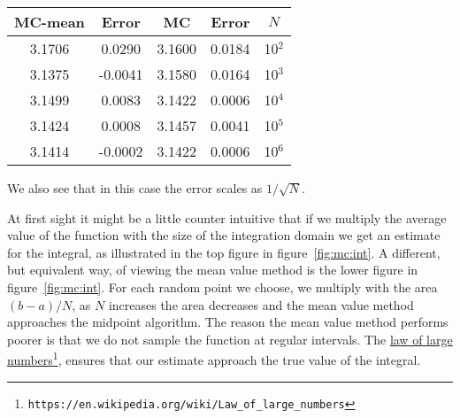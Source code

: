 \documentclass[graybox,sectrefs,envcountresetchap,open=right,final]{svmonodo}
\newenvironment{graybox2admon}[1][]{
\begin{graybox2mdframed}[frametitle=#1]
}
{
\end{graybox2mdframed}
}
\begin{document}
{\small   %

\vspace{4mm}

\begin{tabular}{ccccc}
\hline
\multicolumn{1}{c}{ MC-mean } & \multicolumn{1}{c}{ Error } & \multicolumn{1}{c}{ MC } & \multicolumn{1}{c}{ Error } & \multicolumn{1}{c}{ $N$ } \\
\hline
3.1706  & 0.0290  & 3.1600 & 0.0184 & 10$^2$ \\
3.1375  & -0.0041 & 3.1580 & 0.0164 & 10$^3$ \\
3.1499  & 0.0083  & 3.1422 & 0.0006 & 10$^4$ \\
3.1424  & 0.0008  & 3.1457 & 0.0041 & 10$^5$ \\
3.1414  & -0.0002 & 3.1422 & 0.0006 & 10$^6$ \\
\hline
\end{tabular}

\vspace{4mm}

}


\noindent
We also see that in this case the error scales as $1/\sqrt{N}$.


\begin{graybox2admon}[Notice]
At first sight it might be a little counter intuitive that if we
multiply the average value of the function with the size of the
integration domain we get an estimate for the integral, as illustrated
in the top figure in figure~\ref{fig:mc:int}. A different, but
equivalent way, of viewing the mean value method is the lower figure
in figure~\ref{fig:mc:int}. For each random point we choose, we
multiply with the area $(b-a)/N$, as $N$ increases the area decreases
and the mean value method approaches the midpoint algorithm. The
reason the mean value method performs poorer is that we do not sample
the function at regular intervals. The \href{{https://en.wikipedia.org/wiki/Law_of_large_numbers}}{law of large
numbers}\footnote{\texttt{https://en.wikipedia.org/wiki/Law\_of\_large\_numbers}}, ensures
that our estimate approach the true value of the integral.
\end{graybox2admon}
\end{document}
